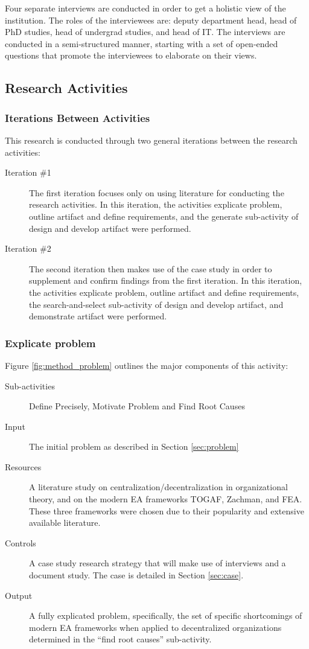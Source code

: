 Four separate interviews are conducted in order to get a holistic view of the institution. The roles of the interviewees are: deputy department head, head of PhD studies, head of undergrad studies, and head of IT. The interviews are conducted in a semi-structured manner, starting with a set of open-ended questions that promote the interviewees to elaborate on their views. 

\subsection{Research Activities}

\subsubsection*{Iterations Between Activities}

This research is conducted through two general iterations between the research activities:
\begin{description}
  \item[Iteration \#1] The first iteration focuses only on using literature for conducting the research activities. In this iteration, the activities explicate problem, outline artifact and define requirements, and the generate sub-activity of design and develop artifact were performed. 
  \item[Iteration \#2] The second iteration then makes use of the case study in order to supplement and confirm findings from the first iteration. In this iteration, the activities explicate problem, outline artifact and define requirements, the search-and-select sub-activity of design and develop artifact, and demonstrate artifact were performed.
\end{description}

\subsubsection*{Explicate problem}

Figure \ref{fig:method_problem} outlines the major components of this activity:
\begin{description}
  \item[Sub-activities] Define Precisely, Motivate Problem and Find Root Causes~\cite[Ch. 5]{johannessonPerjons2012}
  \item[Input] The initial problem as described in Section \ref{sec:problem}
  \item[Resources] A literature study on centralization/decentralization in  organizational theory, and on the modern EA frameworks TOGAF, Zachman, and FEA. These three frameworks were chosen due to their popularity and extensive available literature.
  \item[Controls] A case study research strategy that will make use of interviews and a document study. The case is detailed in Section \ref{sec:case}. 
  \item[Output] A fully explicated problem, specifically, the set of specific shortcomings of modern EA frameworks when applied to decentralized organizations determined in the ``find root causes'' sub-activity.
\end{description}

